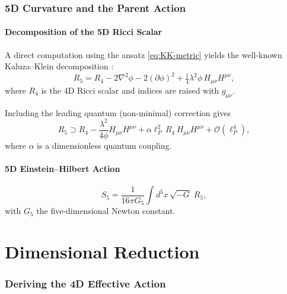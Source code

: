 \documentclass[12pt,a4paper]{article}
\newcommand{\gm}{g_{\mu\nu}}       %
\newcommand{\lP}{\ell_P}           %
\newcommand{\lam}{\lambda}         %
\begin{document}
\section{5D Curvature and the Parent Action}
\label{sec:5D-action}

\subsection{Decomposition of the 5D Ricci Scalar}

A direct computation using the ansatz \eqref{eq:KK-metric} yields the
well-known Kaluza--Klein decomposition \citep{Overduin1997}:
\begin{equation}
  R_5 = R_4 - 2\nabla^2\phi - 2(\partial\phi)^2
        + \tfrac{1}{4}\lam^2\phi\, H_{\mu\nu}H^{\mu\nu} ,
  \label{eq:R5-decomp}
\end{equation}
where $R_4$ is the 4D Ricci scalar and indices are raised with $\gm$.

Including the leading quantum (non-minimal) correction gives
\begin{equation}
  R_5 \supset R_4 - \frac{\lam^2}{4\phi} H_{\mu\nu}H^{\mu\nu}
       + \alpha \lP^2\, R_4\, H_{\mu\nu}H^{\mu\nu} + \mathcal{O}(\lP^4) ,
  \label{eq:R5-quantum}
\end{equation}
where $\alpha$ is a dimensionless quantum coupling.

\subsection{5D Einstein--Hilbert Action}

\begin{equation}
  S_5 = \frac{1}{16\pi G_5}\int d^5x\,\sqrt{-G}\;R_5 ,
  \label{eq:S5}
\end{equation}
with $G_5$ the five-dimensional Newton constant.

\part{Dimensional Reduction}

\section{Deriving the 4D Effective Action}
\label{sec:4D-action}
\end{document}
